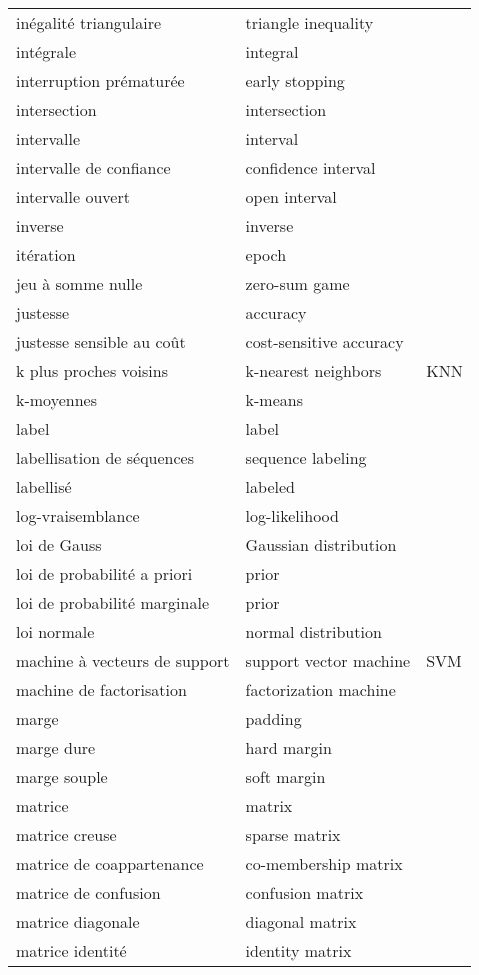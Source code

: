 \begin{longtable}{p{} p{} p{}}
inégalité triangulaire & triangle inequality &  \\ 
intégrale & integral &  \\ 
interruption prématurée & early stopping &  \\ 
intersection & intersection &  \\ 
intervalle & interval &  \\ 
intervalle de confiance & confidence interval &  \\ 
intervalle ouvert & open interval &  \\ 
inverse & inverse &  \\ 
itération & epoch &  \\ 
jeu à somme nulle & zero-sum game &  \\ 
justesse & accuracy &  \\ 
justesse sensible au coût & cost-sensitive accuracy &  \\ 
k plus proches voisins & k-nearest neighbors & KNN \\ 
k-moyennes & k-means &  \\ 
label & label &  \\ 
labellisation de séquences & sequence labeling &  \\ 
labellisé & labeled &  \\ 
log-vraisemblance & log-likelihood &  \\ 
loi de Gauss & Gaussian distribution &  \\ 
loi de probabilité a priori & prior &  \\ 
loi de probabilité marginale & prior &  \\ 
loi normale & normal distribution &  \\ 
machine à vecteurs de support & support vector machine & SVM \\ 
machine de factorisation & factorization machine &  \\ 
marge & padding &  \\ 
marge dure & hard margin &  \\ 
marge souple & soft margin &  \\ 
matrice & matrix &  \\ 
matrice creuse & sparse matrix &  \\ 
matrice de coappartenance & co-membership matrix &  \\ 
matrice de confusion & confusion matrix &  \\ 
matrice diagonale & diagonal matrix &  \\ 
matrice identité & identity matrix &  \\ 

\end{longtable}
